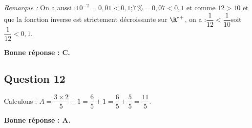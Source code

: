 	\emph{Remarque :} On a aussi :$10^{-2} = 0,01 < 0,1$;\quad $7\,\% = 0,07 < 0,1$ \quad et  comme \quad $12 > 10$ \quad et que la fonction inverse est strictement décroissante  sur $\R^{*+}$, on a :\quad $\dfrac{1}{12} < \dfrac{1}{10}$\quad soit \quad $\dfrac{1}{12} < 0,1$.

	\textbf{Bonne réponse : C.}

\subsection*{Question 12}
	Calculons :\quad
	$A = \dfrac{3 \times 2}{5} + 1 = \dfrac{6}{5} + 1 = \dfrac65+\dfrac55 = \dfrac{11}{5}$.

	\textbf{Bonne réponse : A.}

